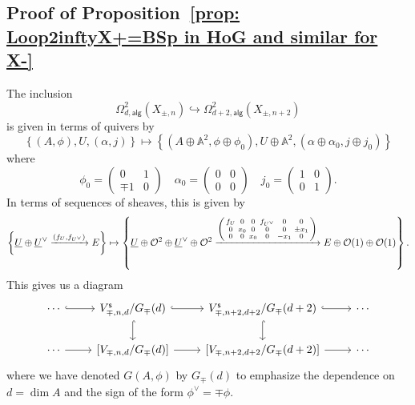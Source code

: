 \message{ !name(Bryan-Vakil.tex)}\documentclass{amsart}
\theoremstyle{definition}
\renewcommand{\AA} {{\mathbb A}}
\newcommand{\OO}{\mathcal{O}}
\newcommand{\UL}[1]{\underline{#1}}
\newcommand{\alg}{\mathsf{alg}}
\newcommand{\stable}{\mathsf{s}}
\newcommand{\LoopTwo}{\Omega^{2}_{d,\alg}}
\begin{document}
\subsection{Proof of Proposition~\ref{prop: Loop2inftyX+=BSp in HoG and similar for X-}}
  
The inclusion
\[
\LoopTwo (X_{\pm ,n})\hookrightarrow \Omega^{2}_{d+2,\alg}(X_{\pm ,n+2})
\]
is given in terms of quivers by
\[
\left\{(A,\phi ),U,(\alpha ,j) \right\} \mapsto \left\{(A\oplus
\AA^{2},\phi\oplus \phi_{0} ),U\oplus \AA^{2},(\alpha\oplus \alpha_{0}
,j\oplus j_{0}) \right\} 
\]
where
\[
\phi_{0} = \begin{pmatrix} 0&1\\\mp 1&0  \end{pmatrix}\quad
\alpha_{0}=\begin{pmatrix} 0&0\\0&0  \end{pmatrix}\quad
j_{0}=\begin{pmatrix} 1&0\\0&1  \end{pmatrix}. 
\]
In terms of sequences of sheaves, this is given by 
\[
\left\{\UL{U}\oplus \UL{U}^{\vee}\xrightarrow{(f_{U},f_{U^{\vee}})} E
\right\} \mapsto
\left\{\UL{U}\oplus \OO^{2}\oplus \UL{U}^{\vee}\oplus
\OO^{2}\xrightarrow{\begin{psmallmatrix} f_{U}&0&0&f_{U^{\vee}} &0&0\\
0&x_{0}&0&0&0&\pm x_{1}\\
0&0&x_{0}&0&-x_{1}&0  \end{psmallmatrix}} E\oplus \OO (1)\oplus \OO (1) \right\}.
\]
This gives us a diagram
\begin{equation}\label{digram: Vnd/Gd --> Vn+2d+2/Gd+2}
\begin{tikzcd}
    \cdots \arrow[r, hook]
    & V^{\stable}_{\mp ,n,d}/G_{\mp }(d) \arrow[r, hook] \arrow[d, hook]
    & V^{\stable}_{\mp ,n+2,d+2}/G_{\mp }(d+2)  \arrow[r, hook] \arrow[d, hook] & \cdots \\
    \cdots \arrow[r]
    & \left[ V_{\mp ,n,d}/G_{\mp }(d)\right] \arrow[r]
    & \left[V_{\mp ,n+2,d+2}/G_{\mp }(d+2) \right] 
\arrow[r] & \cdots
\end{tikzcd}
\end{equation}
where we have denoted $G(A,\phi )$ by $G_{\mp}(d)$ to emphasize the
dependence on $d=\dim A$ and the sign of the form $\phi^{\vee}=\mp
\phi$.
\end{document}
